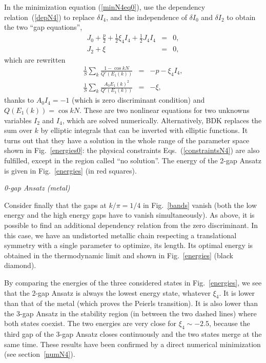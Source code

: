 \documentclass[]{revtex4-1}
\begin{document}
In the minimization equation (\ref{minN4eq0}), use the dependency relation~(\ref{depN4}) to replace $\delta I_4$, and the independence of $\delta I_0$ and $\delta I_2$ to obtain the two ``gap equations'',
\begin{eqnarray}
J_0 + \frac{p}{2}+\frac{1}{2} \xi_4 I_4 + \frac{1}{2} J_4I_4 &=& 0,\\
J_2 + \xi &=& 0, 
\end{eqnarray}
which are rewritten
\begin{eqnarray}
\frac{1}{S} \sum_{k}  \frac{1-\cos kN}{Q'(E_1(k))}  &=& -p - \xi_4 I_4 ,\label{pdiscretek} \\
\frac{1}{S} \sum_{k}  \frac{A_0E_1(k)^2}{Q'(E_1(k))} &=& -\xi, \label{xidiscretek}
\end{eqnarray}
thanks to $A_0I_4=-1$ (which is zero discriminant condition) and $Q(E_1(k))=\cos kN$.
These are two nonlinear equations for two unknowns variables $I_2$ and $I_4$, which are solved numerically. Alternatively, BDK replaces the sum over $k$ by elliptic integrals that can be inverted with elliptic functions.
It turns out that they have a solution in the whole range of the parameter space shown in Fig.~\ref{energies0}: the physical constraints Eqs.~(\ref{constraintsN4}) are also fulfilled, except in the region called ``no solution''.
The energy of the 2-gap Ansatz is given in Fig.~\ref{energies} (in red squares).

\medskip

\textit{0-gap Ansatz (metal)}

\medskip

Consider finally that the gaps at $k/\pi=1/4$ in Fig.~\ref{bands} vanish (both the low energy and the high energy gaps have to vanish simultaneously). As above, it is possible to find an additional dependency relation from the zero discriminant. In this case, we have an undistorted metallic chain respecting a translational symmetry with a single parameter to optimize, its length. Its optimal energy is obtained in the thermodynamic limit and shown in Fig.~\ref{energies} (black diamond). 


\medskip

By comparing the energies of the three considered states in Fig.~\ref{energies}, we see that the 2-gap Ansatz is always the lowest energy state, whatever $\xi_4$. It is lower than that of the metal (which proves the Peierls transition).   It is also lower than the 3-gap Ansatz in the stability region (in between the two dashed lines) where both states coexist. The two energies are very close for $\xi_4 \sim -2.5$, because the third gap of the 3-gap Ansatz closes continuously and the two states merge at the same time. 
These results have been confirmed by a direct numerical minimization (see section~\ref{numN4}).
\end{document}
